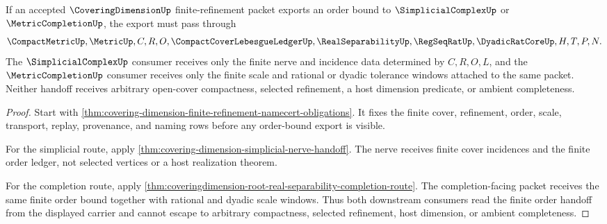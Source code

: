 \begin{theorem}
\label{thm:covering-dimension-finite-order-handoff}
If an accepted $\CoveringDimensionUp$ finite-refinement packet exports an order bound to $\SimplicialComplexUp$ or $\MetricCompletionUp$, the export must pass through
$$
\CompactMetricUp,\MetricUp,C,R,O,\CompactCoverLebesgueLedgerUp,\RealSeparabilityUp,\RegSeqRatUp,\DyadicRatCoreUp,H,T,P,N .
$$
The $\SimplicialComplexUp$ consumer receives only the finite nerve and incidence data determined by $C,R,O,L$, and the $\MetricCompletionUp$ consumer receives only the finite scale and rational or dyadic tolerance windows attached to the same packet. Neither handoff receives arbitrary open-cover compactness, selected refinement, a host dimension predicate, or ambient completeness.
\end{theorem}
\begin{proof}
Start with \autoref{thm:covering-dimension-finite-refinement-namecert-obligations}. It fixes the finite cover, refinement, order, scale, transport, replay, provenance, and naming rows before any order-bound export is visible.

For the simplicial route, apply \autoref{thm:covering-dimension-simplicial-nerve-handoff}. The nerve receives finite cover incidences and the finite order ledger, not selected vertices or a host realization theorem.

For the completion route, apply \autoref{thm:coveringdimension-root-real-separability-completion-route}. The completion-facing packet receives the same finite order bound together with rational and dyadic scale windows. Thus both downstream consumers read the finite order handoff from the displayed carrier and cannot escape to arbitrary compactness, selected refinement, host dimension, or ambient completeness.
\end{proof}

